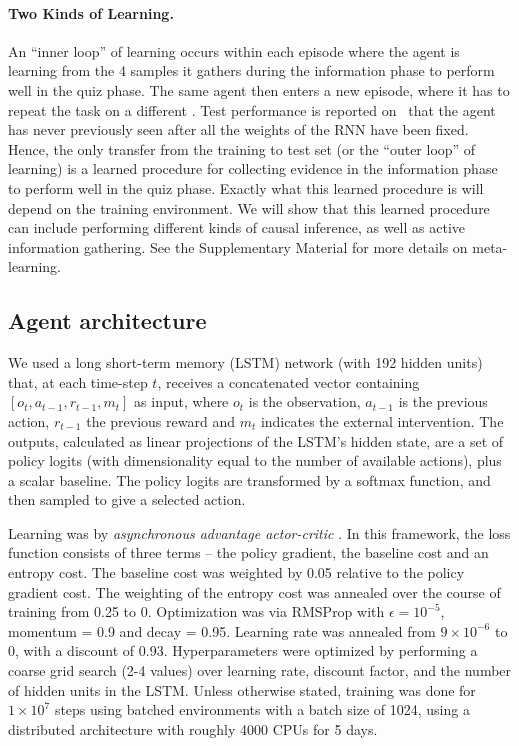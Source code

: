 \paragraph{Two Kinds of Learning.}
An ``inner loop'' of learning occurs within each episode where the agent is learning from the 4 samples it gathers during the information phase to perform well in the quiz phase. The same agent then enters a new episode, where it has to repeat the task on a different \CBN. Test performance is reported on \CBNs~that the agent has never previously seen after all the weights of the RNN have been fixed. Hence, the only transfer from the training to test set (or the ``outer loop'' of learning) is a learned procedure for collecting evidence in the information phase to perform well in the quiz phase. Exactly what this learned procedure is will depend on the training environment. We will show that this learned procedure can include performing different kinds of causal inference, as well as active information gathering. See the Supplementary Material for more details on meta-learning.


\subsection{Agent architecture}

We used a long short-term memory (LSTM) network \citep{hochreiter97long} (with 192 hidden units) that, at each time-step $t$, receives a concatenated vector containing $[o_{t}, a_{t-1}, r_{t-1}, m_{t}]$ as input, where $o_{t}$ is the observation, $a_{t-1}$ is the previous action, $r_{t-1}$ the previous reward and $m_t$ indicates the external intervention. The outputs, calculated as linear projections of the LSTM's hidden state, are a set of policy logits (with dimensionality equal to the number of available actions), plus a scalar baseline. The policy logits are transformed by a softmax function, and then sampled to give a selected action. 

Learning was by \emph{asynchronous advantage actor-critic} \citep{mnih2016}. In this framework, the loss function consists of three terms -- the policy gradient, the baseline cost and an entropy cost. The baseline cost was weighted by 0.05 relative to the policy gradient cost. The weighting of the entropy cost was annealed over the course of training from 0.25 to 0. Optimization was via RMSProp with $\epsilon = 10^{-5}$, momentum = 0.9 and decay = 0.95. Learning rate was annealed from $9\times 10^{-6}$ to 0, with a discount of 0.93. Hyperparameters were optimized by performing a coarse grid search (2-4 values) over learning rate, discount factor, and the number of hidden units in the LSTM. Unless otherwise stated, training was done for $1\times10^7$ steps using batched environments with a batch size of 1024, using a distributed architecture with roughly 4000 CPUs for 5 days.

